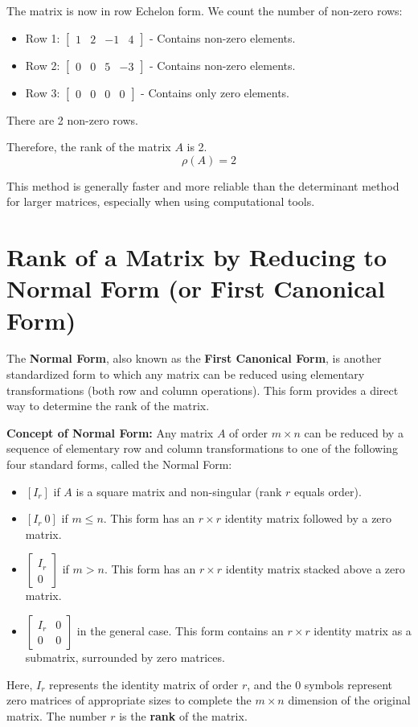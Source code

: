 \documentclass{article}
\begin{document}
The matrix is now in row Echelon form. We count the number of non-zero rows:
\begin{itemize}
    \item Row 1: $\begin{bmatrix} 1 & 2 & -1 & 4 \end{bmatrix}$ - Contains non-zero elements.
    \item Row 2: $\begin{bmatrix} 0 & 0 & 5 & -3 \end{bmatrix}$ - Contains non-zero elements.
    \item Row 3: $\begin{bmatrix} 0 & 0 & 0 & 0 \end{bmatrix}$ - Contains only zero elements.
\end{itemize}
There are 2 non-zero rows.

Therefore, the rank of the matrix $A$ is 2.
\[ \rho(A) = 2 \]

This method is generally faster and more reliable than the determinant method for larger matrices, especially when using computational tools.

\section{Rank of a Matrix by Reducing to Normal Form (or First Canonical Form)}

The \textbf{Normal Form}, also known as the \textbf{First Canonical Form}, is another standardized form to which any matrix can be reduced using elementary transformations (both row and column operations). This form provides a direct way to determine the rank of the matrix.

\textbf{Concept of Normal Form:}
Any matrix $A$ of order $m \times n$ can be reduced by a sequence of elementary row and column transformations to one of the following four standard forms, called the Normal Form:
\begin{itemize}
    \item $[I_r]$ if $A$ is a square matrix and non-singular (rank $r$ equals order).
    \item $[I_r \ 0]$ if $m \leq n$. This form has an $r \times r$ identity matrix followed by a zero matrix.
    \item $\begin{bmatrix} I_r \\ 0 \end{bmatrix}$ if $m > n$. This form has an $r \times r$ identity matrix stacked above a zero matrix.
    \item $\begin{bmatrix} I_r & 0 \\ 0 & 0 \end{bmatrix}$ in the general case. This form contains an $r \times r$ identity matrix as a submatrix, surrounded by zero matrices.
\end{itemize}
Here, $I_r$ represents the identity matrix of order $r$, and the 0 symbols represent zero matrices of appropriate sizes to complete the $m \times n$ dimension of the original matrix. The number $r$ is the \textbf{rank} of the matrix.
\end{document}
